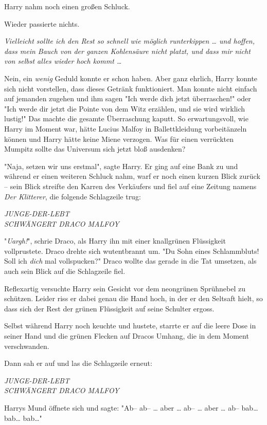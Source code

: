 {Harry nahm noch einen großen Schluck.

Wieder passierte nichts.

\emph{Vielleicht sollte ich den Rest so schnell wie möglich runterkippen … und hoffen, dass mein Bauch von der ganzen Kohlensäure nicht platzt, und dass mir nicht von selbst alles wieder hoch kommt …}

Nein, ein \emph{wenig} Geduld konnte er schon haben. Aber ganz ehrlich, Harry konnte sich nicht vorstellen, dass dieses Getränk funktioniert. Man konnte nicht einfach auf jemanden zugehen und ihm sagen "Ich werde dich jetzt überraschen!" oder "Ich werde dir jetzt die Pointe von dem Witz erzählen, und sie wird wirklich lustig!" Das machte die gesamte Überraschung kaputt. So erwartungsvoll, wie Harry im Moment war, hätte Lucius Malfoy in Ballettkleidung vorbeitänzeln können und Harry hätte keine Miene verzogen. Was für einen verrückten Mumpitz sollte das Universum sich jetzt bloß ausdenken?

"Naja, setzen wir uns erstmal", sagte Harry. Er ging auf eine Bank zu und während er einen weiteren Schluck nahm, warf er noch einen kurzen Blick zurück -- sein Blick streifte den Karren des Verkäufers und fiel auf eine Zeitung namens \emph{Der Klitterer}, die folgende Schlagzeile trug:

\emph{JUNGE-DER-LEBT\\ SCHWÄNGERT DRACO MALFOY}

"\emph{Uargh!}", schrie Draco, als Harry ihn mit einer knallgrünen Flüssigkeit vollprustete. Draco drehte sich wutentbrannt um. "Du Sohn eines Schlammbluts! Soll ich \emph{dich} mal vollspucken?" Draco wollte das gerade in die Tat umsetzen, als auch sein Blick auf die Schlagzeile fiel.

Reflexartig versuchte Harry sein Gesicht vor dem neongrünen Sprühnebel zu schützen. Leider riss er dabei genau die Hand hoch, in der er den Seltsaft hielt, so dass sich der Rest der grünen Flüssigkeit auf seine Schulter ergoss.

Selbst während Harry noch keuchte und hustete, starrte er auf die leere Dose in seiner Hand und die grünen Flecken auf Dracos Umhang, die in dem Moment verschwanden.

Dann sah er auf und las die Schlagzeile erneut:

\emph{JUNGE-DER-LEBT\\ SCHWÄNGERT DRACO MALFOY}

Harrys Mund öffnete sich und sagte: "Ab-- ab-- … aber … ab-- … aber … ab-- bab… bab… bab…"

}
